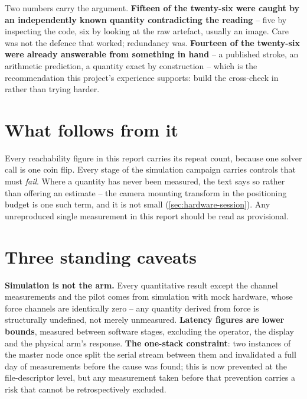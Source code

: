 Two numbers carry the argument. \textbf{Fifteen of the twenty-six were
caught by an independently known quantity contradicting the reading} --
five by inspecting the code, six by looking at the raw artefact, usually an
image. Care was not the defence that worked; redundancy was.
\textbf{Fourteen of the twenty-six were already answerable from something in
hand} -- a published stroke, an arithmetic prediction, a quantity exact by
construction -- which is the recommendation this project's experience
supports: build the cross-check in rather than trying harder.

\section{What follows from it}

Every reachability figure in this report carries its repeat count, because
one solver call is one coin flip. Every stage of the simulation campaign
carries controls that must \emph{fail}. Where a quantity has never been
measured, the text says so rather than offering an estimate -- the camera
mounting transform in the positioning budget is one such term, and it is not
small (\cref{sec:hardware-session}). Any unreproduced single measurement in
this report should be read as provisional.

\section{Three standing caveats}

\textbf{Simulation is not the arm.} Every quantitative result except the
channel measurements and the pilot comes from simulation with mock
hardware, whose force channels are identically zero -- any quantity derived
from force is structurally undefined, not merely unmeasured.
\textbf{Latency figures are lower bounds}, measured between software
stages, excluding the operator, the display and the physical arm's
response. \textbf{The one-stack constraint}: two instances of the master
node once split the serial stream between them and invalidated a full day
of measurements before the cause was found; this is now prevented at the
file-descriptor level, but any measurement taken before that prevention
carries a risk that cannot be retrospectively excluded.
